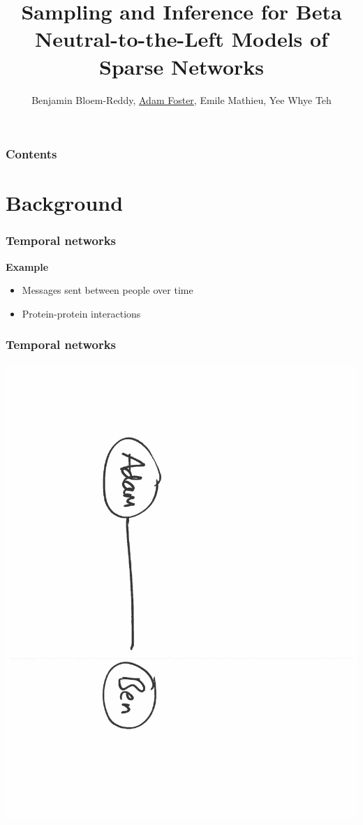 \documentclass[final,hyperref={pdfpagelabels=false},noamsthm]{beamer}
\title{Sampling and Inference for Beta Neutral-to-the-Left Models of Sparse Networks} %
\author{Benjamin Bloem-Reddy, \underline{Adam Foster}, Emile Mathieu, Yee Whye Teh }
\institute{Department of Statistics, University of Oxford}
\begin{document}
	
\begin{frame}[plain]
	\titlepage
\end{frame}

\begin{frame}
	\frametitle{Contents}
	\tableofcontents
\end{frame}

\section{Background}

\begin{frame}
	\frametitle{Temporal networks}
	\textbf{Example}
	\begin{itemize}
		\item Messages sent between people over time
		\item Protein-protein interactions
	\end{itemize}
	
\end{frame}

\begin{frame}
	\frametitle{Temporal networks}
	\includegraphics[angle=90,origin=c,scale=0.4]{fig/socialnet1}
\end{frame}
\end{document}
